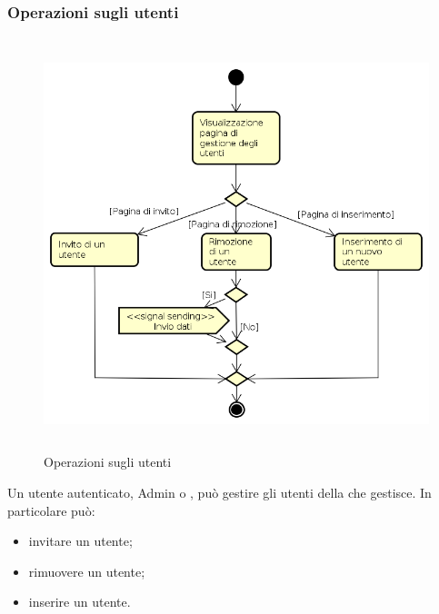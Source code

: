 \subsubsection{Operazioni sugli utenti}
\begin{figure}[H]
\begin{center}
\includegraphics[height=12cm]{res/sections/backend/activities/gestioneUtenti.png}
\caption{Operazioni sugli utenti}
\end{center}
\end{figure}
Un utente autenticato, Admin o , può gestire gli utenti della  che gestisce. In particolare può:
\begin{itemize}
\item invitare un utente;
\item rimuovere un utente;
\item inserire un utente.
\end{itemize}
\newpage
